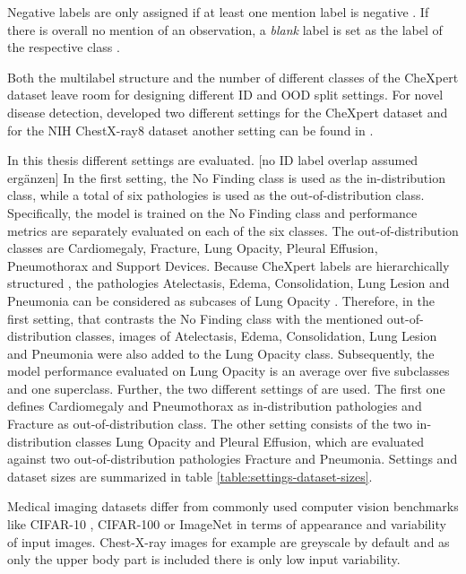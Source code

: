 Negative labels are only assigned if at least one mention label is negative \citep{Irvin2019}. 
If there is overall no mention of an observation, a \textit{blank} label is set as the label of the respective class \citep{Irvin2019}.
\par
Both the multilabel structure and the number of different classes of the CheXpert dataset leave room for designing different ID and OOD split settings.
For novel disease detection, \citep{Berger2021} developed two different settings for the CheXpert dataset and for the NIH ChestX-ray8 dataset \citep{Wang2017} another setting can be found in \citep{Cao2020}.
\par
In this thesis different settings are evaluated.
[no ID label overlap assumed ergänzen]
In the first setting, the No Finding class is used as the in-distribution class, while a total of six pathologies is used as the out-of-distribution class.
Specifically, the model is trained on the No Finding class and performance metrics are separately evaluated on each of the six classes.
The out-of-distribution classes are Cardiomegaly, Fracture, Lung Opacity, Pleural Effusion, Pneumothorax and Support Devices.
Because CheXpert labels are hierarchically structured \cite{Irvin2019}, the pathologies Atelectasis, Edema, Consolidation, Lung Lesion and Pneumonia can be considered as subcases of Lung Opacity \textcolor{red}{\citep{Hansell2008}}.
Therefore, in the first setting, that contrasts the No Finding class with the mentioned out-of-distribution classes, images of Atelectasis, Edema, Consolidation, Lung Lesion and Pneumonia were also added to the Lung Opacity class.
Subsequently, the model performance evaluated on Lung Opacity is an average over five subclasses and one superclass.
Further, the two different settings of \citep{Berger2021} are used.
The first one defines Cardiomegaly and Pneumothorax as in-distribution pathologies and Fracture as out-of-distribution class.
The other setting consists of the two in-distribution classes Lung Opacity and Pleural Effusion, which are evaluated against two out-of-distribution pathologies Fracture and Pneumonia.
Settings and dataset sizes are summarized in table \ref{table:settings-dataset-sizes}.
\par
Medical imaging datasets differ from commonly used computer vision benchmarks like CIFAR-10 \citep{Krizhevsky2009a}, CIFAR-100 \citep{Krizhevsky2009b} or ImageNet \citep{Deng2009} in terms of appearance and variability of input images.
Chest-X-ray images for example are greyscale by default and as only the upper body part is included there is only low input variability.
